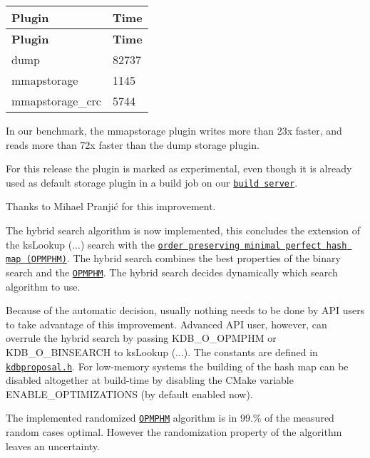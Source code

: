 \tabulinesep=1mm
\begin{longtabu} spread 0pt [c]{*{2}{|X[-1]}|}
\hline
\rowcolor{\tableheadbgcolor}\textbf{ Plugin }&\textbf{ Time  }\\
\endfirsthead
\hline
\endfoot
\hline
\rowcolor{\tableheadbgcolor}\textbf{ Plugin }&\textbf{ Time  }\\
\endhead
{\ttfamily dump} &82737 \\
{\ttfamily mmapstorage} &1145 \\
{\ttfamily mmapstorage\+\_\+crc} &5744 \\
\end{longtabu}
In our benchmark, the {\ttfamily mmapstorage} plugin writes more than 23x faster, and reads more than 72x faster than the {\ttfamily dump} storage plugin.

For this release the plugin is marked as experimental, even though it is already used as default storage plugin in a build job on our \href{https://build.libelektra.org}{\tt build server}.

Thanks to Mihael Pranjić for this improvement.

The hybrid search algorithm is now implemented, this concludes the extension of the {\ttfamily ks\+Lookup (...)} search with the \href{https://master.libelektra.org/doc/dev/data-structures.md#order-preserving-minimal-perfect-hash-map-aka-opmphm}{\tt order preserving minimal perfect hash map (O\+P\+M\+P\+HM)}. The hybrid search combines the best properties of the binary search and the \href{https://master.libelektra.org/doc/dev/data-structures.md#order-preserving-minimal-perfect-hash-map-aka-opmphm}{\tt O\+P\+M\+P\+HM}. The hybrid search decides dynamically which search algorithm to use.

Because of the automatic decision, usually nothing needs to be done by A\+PI users to take advantage of this improvement. Advanced A\+PI user, however, can overrule the hybrid search by passing {\ttfamily K\+D\+B\+\_\+\+O\+\_\+\+O\+P\+M\+P\+HM} or {\ttfamily K\+D\+B\+\_\+\+O\+\_\+\+B\+I\+N\+S\+E\+A\+R\+CH} to {\ttfamily ks\+Lookup (...)}. The constants are defined in \href{https://master.libelektra.org/src/include/kdbproposal.h}{\tt kdbproposal.\+h}. For low-\/memory systems the building of the hash map can be disabled altogether at build-\/time by disabling the C\+Make variable {\ttfamily E\+N\+A\+B\+L\+E\+\_\+\+O\+P\+T\+I\+M\+I\+Z\+A\+T\+I\+O\+NS} (by default enabled now).

The implemented randomized \href{https://master.libelektra.org/doc/dev/data-structures.md#order-preserving-minimal-perfect-hash-map-aka-opmphm}{\tt O\+P\+M\+P\+HM} algorithm is in 99.\% of the measured random cases optimal. However the randomization property of the algorithm leaves an uncertainty.

